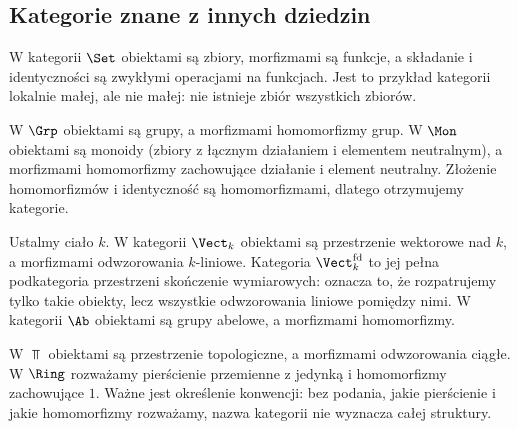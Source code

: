 \subsection{Kategorie znane z innych dziedzin}

\begin{przyklad}[Zbiory]
W kategorii $\Set$ obiektami są zbiory, morfizmami są funkcje, a składanie i identyczności są zwykłymi operacjami na funkcjach. Jest to przykład kategorii lokalnie małej, ale nie małej: nie istnieje zbiór wszystkich zbiorów.
\end{przyklad}

\begin{przyklad}
W $\Grp$ obiektami są grupy, a morfizmami homomorfizmy grup. W $\Mon$ obiektami są monoidy (zbiory z łącznym działaniem i elementem neutralnym), a morfizmami homomorfizmy zachowujące działanie i element neutralny. Złożenie homomorfizmów i identyczność są homomorfizmami, dlatego otrzymujemy kategorie.
\end{przyklad}

\begin{przyklad}
Ustalmy ciało $k$. W kategorii $\Vect_k$ obiektami są przestrzenie wektorowe nad $k$, a morfizmami odwzorowania $k$-liniowe. Kategoria $\Vect_k^{\mathrm{fd}}$ to jej pełna podkategoria przestrzeni skończenie wymiarowych: oznacza to, że rozpatrujemy tylko takie obiekty, lecz wszystkie odwzorowania liniowe pomiędzy nimi. W kategorii $\Ab$ obiektami są grupy abelowe, a morfizmami homomorfizmy.
\end{przyklad}

\begin{przyklad}
W $\Top$ obiektami są przestrzenie topologiczne, a morfizmami odwzorowania ciągłe. W $\Ring$ rozważamy pierścienie przemienne z jedynką i homomorfizmy zachowujące $1$. Ważne jest określenie konwencji: bez podania, jakie pierścienie i jakie homomorfizmy rozważamy, nazwa kategorii nie wyznacza całej struktury.
\end{przyklad}

